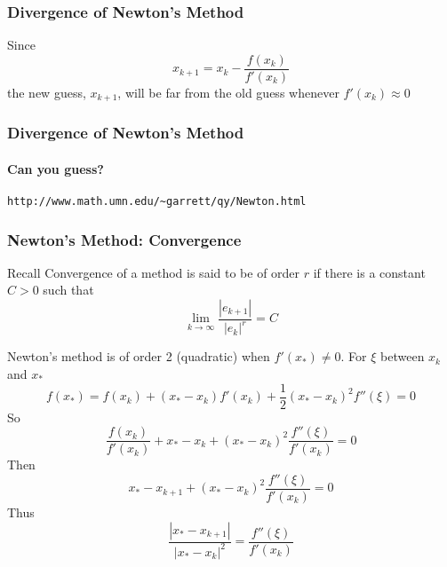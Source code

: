 \documentclass[10pt]{beamer}
\begin{document}
\begin{frame}
\frametitle{Divergence of Newton's Method}

\vspace{4ex}
\begin{center}
\end{center}

\vspace{3ex}
Since
\begin{equation*}
    x_{k+1} = x_k - \frac{f(x_k)}{f'(x_k)}
\end{equation*}
the new guess, $x_{k+1}$, will be far from the old guess
whenever $f'(x_k)\approx 0$




\end{frame}
\begin{frame}
\frametitle{Divergence of Newton's Method}
\framesubtitle{Can you guess?}

\begin{center}
\end{center}

\texttt{http://www.math.umn.edu/\~{}garrett/qy/Newton.html}
\end{frame}
\begin{frame}[shrink]
\frametitle{Newton's Method: Convergence}
\begin{block}{Recall}
  Convergence of a method is said to be of order $r$ if there is a
constant $C>0$ such that
\begin{equation*}
  \lim_{k\rightarrow \infty} \frac{|e_{k+1}|}{|e_k|^r} = C
\end{equation*}
\end{block}
Newton's method is of order 2 (quadratic) when $f'(x_{*}) \ne 0$.
\bigskip
For $\xi$ between $x_k$ and $x_{*}$
\begin{equation*}
  f(x_{*}) = f(x_k) + (x_{*}-x_k)f'(x_k) + \frac{1}{2}(x_{*}-x_k)^2 f''(\xi) = 0
\end{equation*}
So
\begin{equation*}
  \frac{f(x_k)}{f'(x_k)} + x_{*}-x_k + (x_{*}-x_k)^2 \frac{f''(\xi)}{f'(x_k)} = 0
\end{equation*}
Then
\begin{equation*}
  x_{*}-x_{k+1} + (x_{*}-x_k)^2 \frac{f''(\xi)}{f'(x_k)} = 0
\end{equation*}
Thus
\begin{equation*}
  \frac{\left|x_{*}-x_{k+1}\right|}{\left|x_{*}-x_k\right|^2}  = \frac{f''(\xi)}{f'(x_k)}
\end{equation*}
\end{frame}
\end{document}
